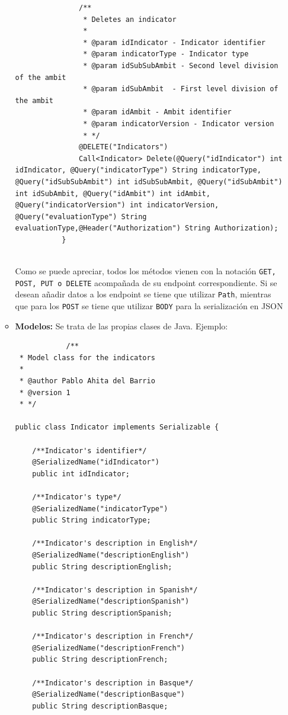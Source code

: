 \begin{itemize}
\begin{itemize}
\begin{lstlisting}
               /**
                * Deletes an indicator
                *
                * @param idIndicator - Indicator identifier
                * @param indicatorType - Indicator type
                * @param idSubSubAmbit - Second level division of the ambit
                * @param idSubAmbit  - First level division of the ambit
                * @param idAmbit - Ambit identifier
                * @param indicatorVersion - Indicator version
                * */
               @DELETE("Indicators")
               Call<Indicator> Delete(@Query("idIndicator") int idIndicator, @Query("indicatorType") String indicatorType, @Query("idSubSubAmbit") int idSubSubAmbit, @Query("idSubAmbit") int idSubAmbit, @Query("idAmbit") int idAmbit, @Query("indicatorVersion") int indicatorVersion, @Query("evaluationType") String evaluationType,@Header("Authorization") String Authorization);
           }
           
        \end{lstlisting}
        Como se puede apreciar, todos los métodos vienen con la notación \texttt{GET, POST, PUT o DELETE} acompañada de su endpoint correspondiente. Si se desean añadir datos a los endpoint se tiene que utilizar \texttt{Path}, mientras que para los \texttt{POST} se tiene que utilizar \texttt{BODY} para la serialización en JSON
        \item \textbf{Modelos: }Se trata de las propias clases de Java. Ejemplo:
        \begin{lstlisting}
            /**
 * Model class for the indicators
 *
 * @author Pablo Ahita del Barrio
 * @version 1
 * */

public class Indicator implements Serializable {

    /**Indicator's identifier*/
    @SerializedName("idIndicator")
    public int idIndicator;

    /**Indicator's type*/
    @SerializedName("indicatorType")
    public String indicatorType;

    /**Indicator's description in English*/
    @SerializedName("descriptionEnglish")
    public String descriptionEnglish;

    /**Indicator's description in Spanish*/
    @SerializedName("descriptionSpanish")
    public String descriptionSpanish;

    /**Indicator's description in French*/
    @SerializedName("descriptionFrench")
    public String descriptionFrench;

    /**Indicator's description in Basque*/
    @SerializedName("descriptionBasque")
    public String descriptionBasque;


\end{lstlisting}
\end{itemize}
\end{itemize}
